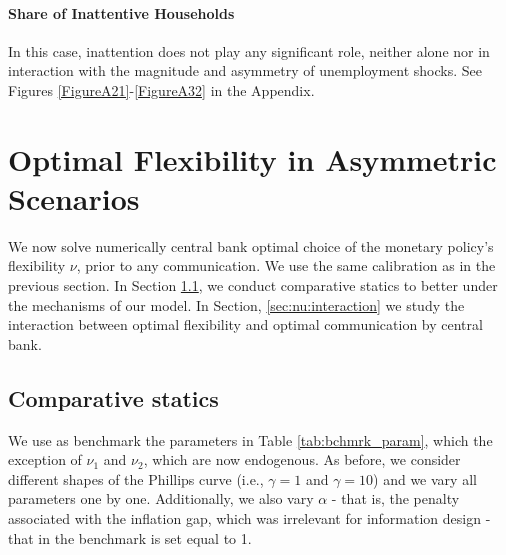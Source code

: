\documentclass[12pt,a4paper]{article}
\begin{document}
\paragraph{Share of Inattentive Households}
\label{sec:nu}
In this case, inattention does not play any significant role, neither alone nor in interaction with the magnitude and asymmetry of unemployment shocks. See Figures \ref{FigureA21}-\ref{FigureA32} in the Appendix.

\section{Optimal Flexibility in Asymmetric Scenarios} 
We now solve numerically central bank optimal choice of the monetary policy's flexibility $\nu$, prior to any communication. We use the same calibration as in the previous section. In Section \ref{sec:nu:compare}, we conduct comparative statics to better under the mechanisms of our model. In Section, \ref{sec:nu:interaction} we study the interaction between optimal flexibility and optimal communication by central bank.

\subsection{Comparative statics}
\label{sec:nu:compare}
We use as benchmark the parameters in Table \ref{tab:bchmrk_param}, which the exception of $\nu_1$ and $\nu_2$, which are now endogenous. As before, we consider different shapes of the Phillips curve (i.e., $\gamma=1$ and $\gamma=10$) and we vary all parameters one by one. Additionally, we also vary $\alpha$ - that is, the penalty associated with the inflation gap, which was irrelevant for information design - that in the benchmark is set equal to 1.
\end{document}
